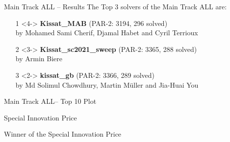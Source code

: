 \documentclass[trans]{beamer}
\begin{document}
\begin{frame}{Main Track ALL -- Results}
The Top 3 solvers of the Main Track ALL are:
\begin{itemize}
\item[1]<4-> {\bf Kissat\_MAB} (PAR-2: 3194, 296 solved)\\
by Mohamed Sami Cherif, Djamal Habet and Cyril Terrioux
\item[2]<3-> {\bf Kissat\_sc2021\_sweep} (PAR-2: 3365, 288 solved)  \\
by Armin Biere
\item[3]<2-> {\bf kissat\_gb} (PAR-2: 3366, 289 solved)\\
by Md Solimul Chowdhury, Martin Müller and Jia-Huai You
\end{itemize}
\end{frame}

\begin{frame}{Main Track ALL-- Top 10 Plot}
\centering
\resizebox{.9\textwidth}{!}{%

}
\end{frame}


\begin{frame}{Special Innovation Price}

\begin{block}{Winner of the Special Innovation Price}
\end{block}

\end{frame}
\end{document}
